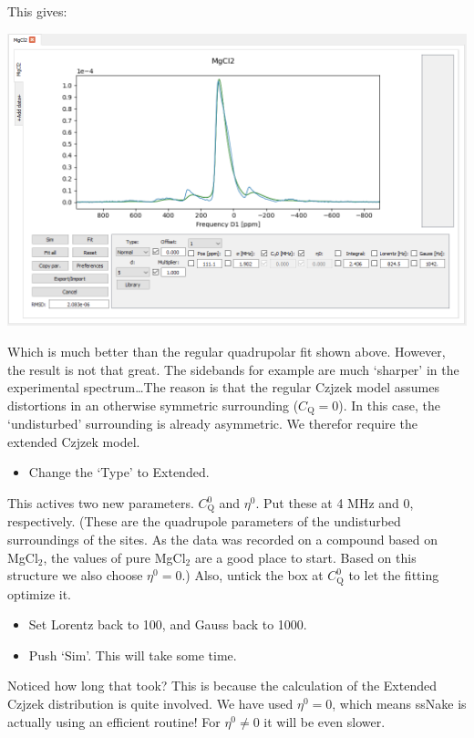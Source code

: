 \documentclass[11pt,a4paper]{article}
\begin{document}
This gives:
\begin{center}
\includegraphics[width=0.8\linewidth]{Figs/fig8.PNG}
\end{center}
Which is much better than the regular quadrupolar fit shown above. However, the result is not that great. The sidebands for example are much `sharper' in the experimental spectrum\ldots The reason is that the regular Czjzek model assumes distortions in an otherwise symmetric surrounding ($C_\text{Q}=0$). In this case, the `undisturbed' surrounding is already asymmetric. We therefor require the extended Czjzek model. 
\begin{itemize}
  \item Change the `Type' to Extended.
\end{itemize}
This actives two new parameters. $C_\text{Q}^0$ and $\eta^0$. Put these at 4 MHz and 0, respectively. (These are the quadrupole parameters of the undisturbed surroundings of the sites. As the data was recorded on a compound based on MgCl$_2$, the values of pure MgCl$_2$ are a good place to start. Based on this structure we also choose $\eta^0=0$.) Also, untick the box at $C_\text{Q}^0$ to let the fitting optimize it.
\begin{itemize}
  \item Set Lorentz back to 100, and Gauss back to 1000.
  \item Push `Sim'. This will take some time.
\end{itemize}
Noticed how long that took? This is because the calculation of the Extended Czjzek distribution is quite involved. We have used $\eta^0=0$, which means ssNake is actually using an efficient routine! For $\eta^0\neq0$ it will be even slower.
\end{document}
